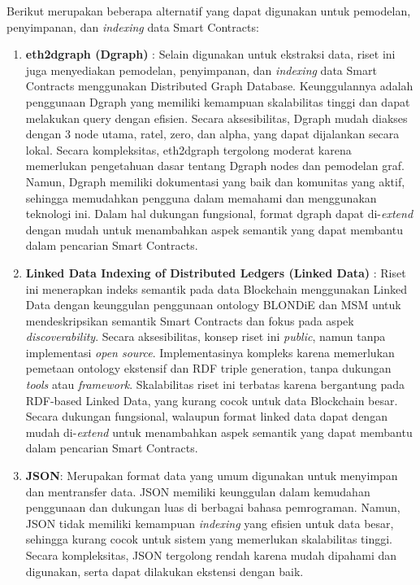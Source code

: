 Berikut merupakan beberapa alternatif yang dapat digunakan untuk pemodelan, penyimpanan, dan \textit{indexing} data Smart Contracts:
\begin{enumerate}
    \item \textbf{eth2dgraph (Dgraph)} \parencite{aimar2023extraction}: Selain digunakan untuk ekstraksi data, riset ini juga menyediakan pemodelan, penyimpanan, dan \textit{indexing} data Smart Contracts menggunakan Distributed Graph Database. Keunggulannya adalah penggunaan Dgraph yang memiliki kemampuan skalabilitas tinggi dan dapat melakukan query dengan efisien. Secara aksesibilitas, Dgraph mudah diakses dengan 3 node utama, ratel, zero, dan alpha, yang dapat dijalankan secara lokal. Secara kompleksitas, eth2dgraph tergolong moderat karena memerlukan pengetahuan dasar tentang Dgraph nodes dan pemodelan graf. Namun, Dgraph memiliki dokumentasi yang baik dan komunitas yang aktif, sehingga memudahkan pengguna dalam memahami dan menggunakan teknologi ini. Dalam hal dukungan fungsional, format dgraph dapat di-\textit{extend} dengan mudah untuk menambahkan aspek semantik yang dapat membantu dalam pencarian Smart Contracts.
    
    \item \textbf{Linked Data Indexing of Distributed Ledgers (Linked Data)} \parencite{third2017linked}: Riset ini menerapkan indeks semantik pada data Blockchain menggunakan Linked Data dengan keunggulan penggunaan ontology BLONDiE dan MSM untuk mendeskripsikan semantik Smart Contracts dan fokus pada aspek \textit{discoverability}. Secara aksesibilitas, konsep riset ini \textit{public}, namun tanpa implementasi \textit{open source}. Implementasinya kompleks karena memerlukan pemetaan ontology ekstensif dan RDF triple generation, tanpa dukungan \textit{tools} atau \textit{framework}. Skalabilitas riset ini terbatas karena bergantung pada RDF-based Linked Data, yang kurang cocok untuk data Blockchain besar. Secara dukungan fungsional, walaupun format linked data dapat dengan mudah di-\textit{extend} untuk menambahkan aspek semantik yang dapat membantu dalam pencarian Smart Contracts.
    
    \item \textbf{JSON}: Merupakan format data yang umum digunakan untuk menyimpan dan mentransfer data. JSON memiliki keunggulan dalam kemudahan penggunaan dan dukungan luas di berbagai bahasa pemrograman. Namun, JSON tidak memiliki kemampuan \textit{indexing} yang efisien untuk data besar, sehingga kurang cocok untuk sistem yang memerlukan skalabilitas tinggi. Secara kompleksitas, JSON tergolong rendah karena mudah dipahami dan digunakan, serta dapat dilakukan ekstensi dengan baik.
    

\end{enumerate}
